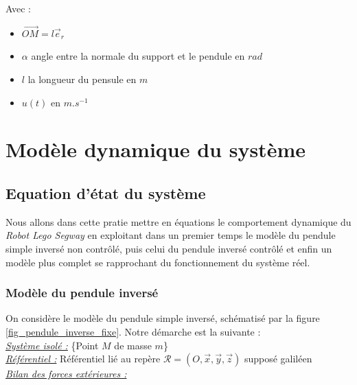 \documentclass[a4paper]{article}
\begin{document}
                Avec :
                \begin{itemize}
                        \item $\overrightarrow{OM} = l \vec{e}_r$
                        \item $\alpha$ angle entre la normale du support et le pendule en $rad$ 
                        \item $l$ la longueur du pensule en $m$
                        \item $u(t)$ en $m.s^{-1}$
                \end{itemize}

        \section{Modèle dynamique du système}

                \subsection{Equation d'état du système}

                        Nous allons dans cette pratie mettre en équations le comportement dynamique du \textit{Robot Lego Segway}
                        en exploitant dans un premier temps le modèle du pendule simple inversé non contrôlé, puis celui
                        du pendule inversé contrôlé et enfin un modèle plus complet se rapprochant du fonctionnement du système réel.

                        \subsubsection{Modèle du pendule inversé}

                                On considère le modèle du pendule simple inversé, schématisé par la figure \ref{fig_pendule_inverse_fixe}.
                                Notre démarche est la suivante : \\

                                \underline{\textit{Système isolé :}} \{Point $M$ de masse $m$\} \\

                                \underline{\textit{Référentiel :}} Référentiel lié au repère $\mathcal{R} = (O,\vec{x}, \vec{y}, \vec{z})$ supposé galiléen \\

                                \underline{\textit{Bilan des forces extérieures :}} \\
                                
\end{document}
